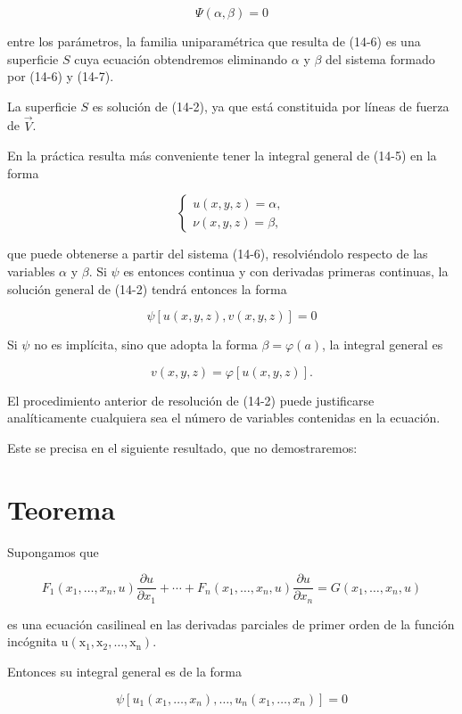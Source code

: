\documentclass[10pt]{article}
\theoremstyle{plain}
\theoremstyle{definition}
\theoremstyle{remark}
\begin{document}
\begin{equation*}
\Psi(\alpha, \beta)=0 \tag{14-7}
\end{equation*}


entre los parámetros, la familia uniparamétrica que resulta de (14-6) es una superficie $S$ cuya ecuación obtendremos eliminando $\alpha$ y $\beta$ del sistema formado por (14-6) y (14-7).

La superficie $S$ es solución de (14-2), ya que está constituida por líneas de fuerza de $\vec{V}$.

En la práctica resulta más conveniente tener la integral general de (14-5) en la forma

$$
\left\{\begin{array}{l}
u(x, y, z)=\alpha, \\
\nu(x, y, z)=\beta,
\end{array}\right.
$$

que puede obtenerse a partir del sistema (14-6), resolviéndolo respecto de las variables $\alpha$ y $\beta$. Si $\psi$ es entonces continua y con derivadas primeras continuas, la solución general de (14-2) tendrá entonces la forma

$$
\psi[u(x, y, z), v(x, y, z)]=0
$$

Si $\psi$ no es implícita, sino que adopta la forma $\beta=\varphi(a)$, la integral general es

$$
v(x, y, z)=\varphi[u(x, y, z)] .
$$

El procedimiento anterior de resolución de (14-2) puede justificarse analíticamente cualquiera sea el número de variables contenidas en la ecuación.

Este se precisa en el siguiente resultado, que no demostraremos:

\section*{Teorema}
Supongamos que

$$
F_{1}\left(x_{1}, \ldots, x_{n}, u\right) \frac{\partial u}{\partial x_{1}}+\cdots+F_{n}\left(x_{1}, \ldots, x_{n}, u\right) \frac{\partial u}{\partial x_{n}}=G\left(x_{1}, \ldots, x_{n}, u\right)
$$

es una ecuación casilineal en las derivadas parciales de primer orden de la función incógnita $\mathrm{u}\left(\mathrm{x}_{1}, \mathrm{x}_{2}, \ldots, \mathrm{x}_{\mathrm{n}}\right)$.

Entonces su integral general es de la forma

$$
\psi\left[u_{1}\left(x_{1}, \ldots, x_{n}\right), \ldots, u_{n}\left(x_{1}, \ldots, x_{n}\right)\right]=0
$$
\end{document}
